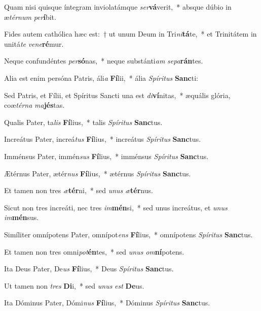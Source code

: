 \item Quam nisi quisque íntegram inviolatámque \textit{ser}\textbf{vá}verit,~* absque dúbio in æ\textit{tér}\textit{num} \textit{per}\textbf{í}bit.
\item Fides autem cathólica hæc est:~† ut unum Deum in Tri\textit{ni}\textbf{tá}te,~* et Trinitátem in unitá\textit{te} \textit{ve}\textit{ne}\textbf{ré}mur.
\item Neque confundéntes \textit{per}\textbf{só}nas,~* neque substánti\textit{am} \textit{se}\textit{pa}\textbf{rán}tes.
\item Alia est enim persóna Patris, áli\textit{a} \textbf{Fí}lii,~* ália \textit{Spí}\textit{ri}\textit{tus} \textbf{Sanc}ti:
\item Sed Patris, et Fílii, et Spíritus Sancti una est \textit{di}\textbf{ví}nitas,~* æquális glória, coæ\textit{tér}\textit{na} \textit{ma}\textbf{jés}tas.
\item Qualis Pater, ta\textit{lis} \textbf{Fí}lius,~* talis \textit{Spí}\textit{ri}\textit{tus} \textbf{Sanc}tus.
\item Increátus Pater, increá\textit{tus} \textbf{Fí}lius,~* increátus \textit{Spí}\textit{ri}\textit{tus} \textbf{Sanc}tus.
\item Imménsus Pater, immén\textit{sus} \textbf{Fí}lius,~* imménsus \textit{Spí}\textit{ri}\textit{tus} \textbf{Sanc}tus.
\item Ætérnus Pater, ætér\textit{nus} \textbf{Fí}lius,~* ætérnus \textit{Spí}\textit{ri}\textit{tus} \textbf{Sanc}tus.
\item Et tamen non tres \textit{æ}\textbf{tér}ni,~* sed \textit{u}\textit{nus} \textit{æ}\textbf{tér}nus.
\item Sicut non tres increáti, nec tres \textit{im}\textbf{mén}si,~* sed unus increátus, et \textit{u}\textit{nus} \textit{im}\textbf{mén}sus.
\item Simíliter omnípotens Pater, omnípot\textit{ens} \textbf{Fí}lius,~* omnípotens \textit{Spí}\textit{ri}\textit{tus} \textbf{Sanc}tus.
\item Et tamen non tres omni\textit{pot}\textbf{én}tes,~* sed \textit{u}\textit{nus} \textit{om}\textbf{ní}potens.
\item Ita Deus Pater, De\textit{us} \textbf{Fí}lius,~* Deus \textit{Spí}\textit{ri}\textit{tus} \textbf{Sanc}tus.
\item Ut tamen non \textit{tres} \textbf{Di}i,~* sed \textit{u}\textit{nus} \textit{est} \textbf{De}us.
\item Ita Dóminus Pater, Dómi\textit{nus} \textbf{Fí}lius,~* Dóminus \textit{Spí}\textit{ri}\textit{tus} \textbf{Sanc}tus.
